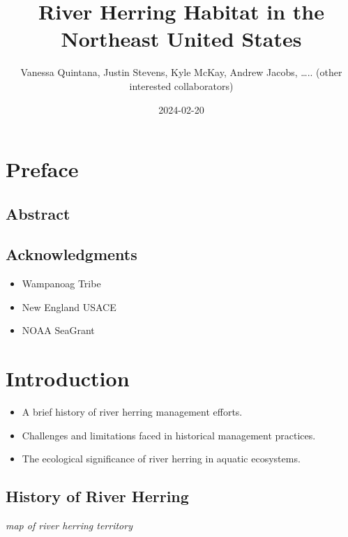 \documentclass[
]{book}
\title{River Herring Habitat in the Northeast United States}
\author{Vanessa Quintana, Justin Stevens, Kyle McKay, Andrew Jacobs, \ldots.. (other interested collaborators)}
\date{2024-02-20}
\providecommand{\tightlist}{%
  \setlength{\itemsep}{0pt}\setlength{\parskip}{0pt}}
\begin{document}
\maketitle

{
\setcounter{tocdepth}{1}
\tableofcontents
}
\hypertarget{preface}{%
\chapter*{Preface}\label{preface}}

\hypertarget{abstract}{%
\section{Abstract}\label{abstract}}

\hypertarget{acknowledgments}{%
\section{Acknowledgments}\label{acknowledgments}}

\begin{itemize}
\tightlist
\item
  Wampanoag Tribe
\item
  New England USACE
\item
  NOAA SeaGrant
\end{itemize}

\hypertarget{intro}{%
\chapter{Introduction}\label{intro}}

\begin{itemize}
\item
  A brief history of river herring management efforts.
\item
  Challenges and limitations faced in historical management practices.
\item
  The ecological significance of river herring in aquatic ecosystems.
\end{itemize}

\hypertarget{history-of-river-herring}{%
\section{History of River Herring}\label{history-of-river-herring}}

\emph{map of river herring territory}
\end{document}
